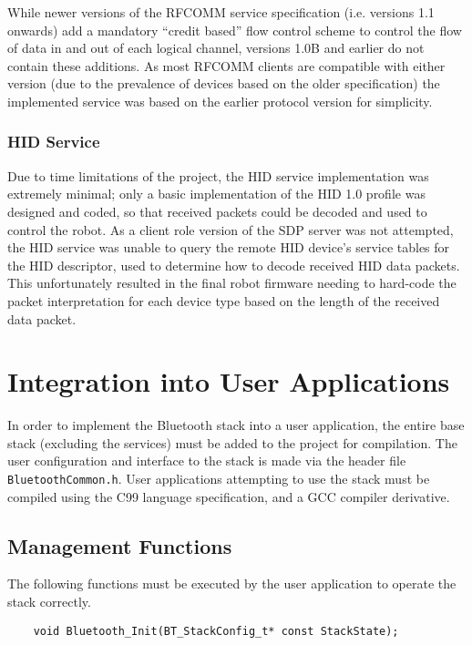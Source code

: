 While newer versions of the RFCOMM service specification (i.e. versions 1.1 onwards) add a mandatory ``credit based'' flow control scheme to control the flow of data in and out of each logical channel, versions 1.0B and earlier do not contain these additions. As most RFCOMM clients are compatible with either version (due to the prevalence of devices based on the older specification) the implemented service was based on the earlier protocol version \cite{rfcommspecs} for simplicity.

\FloatBarrier
\subsubsection{HID Service}

Due to time limitations of the project, the HID service implementation was extremely minimal; only a basic implementation of the HID 1.0 profile \cite{bthidspecs} was designed and coded, so that received packets could be decoded and used to control the robot. As a client role version of the SDP server was not attempted, the HID service was unable to query the remote HID device's service tables for the HID descriptor, used to determine how to decode received HID data packets. This unfortunately resulted in the final robot firmware needing to hard-code the packet interpretation for each device type based on the length of the received data packet.

\section{Integration into User Applications}

In order to implement the Bluetooth stack into a user application, the entire base stack (excluding the services) must be added to the project for compilation. The user configuration and interface to the stack is made via the header file \texttt{BluetoothCommon.h}. User applications attempting to use the stack must be compiled using the C99 language specification, and a GCC compiler derivative.

\FloatBarrier
\subsection{Management Functions}

The following functions must be executed by the user application to operate the stack correctly.

\vspace{1em}
\begin{lstlisting}
	void Bluetooth_Init(BT_StackConfig_t* const StackState);
\end{lstlisting}

